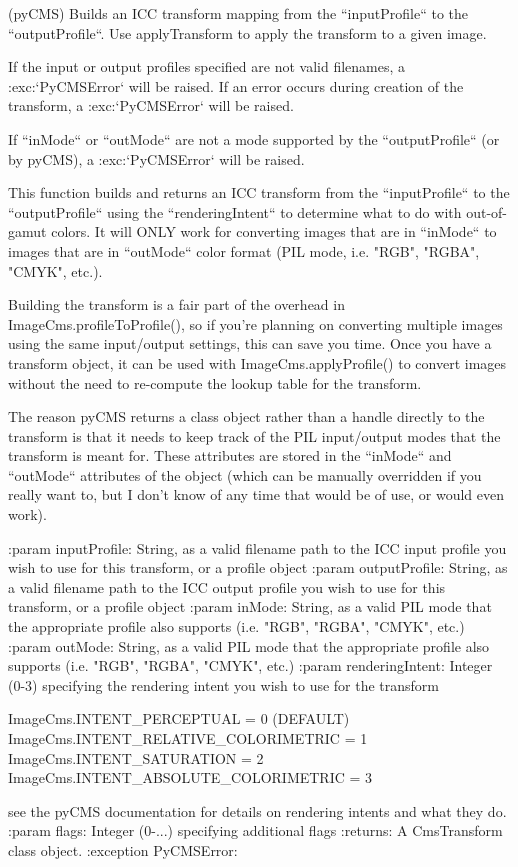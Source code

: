 \begin{DoxyVerb}(pyCMS) Builds an ICC transform mapping from the ``inputProfile`` to the
``outputProfile``. Use applyTransform to apply the transform to a given
image.

If the input or output profiles specified are not valid filenames, a
:exc:`PyCMSError` will be raised. If an error occurs during creation
of the transform, a :exc:`PyCMSError` will be raised.

If ``inMode`` or ``outMode`` are not a mode supported by the ``outputProfile``
(or by pyCMS), a :exc:`PyCMSError` will be raised.

This function builds and returns an ICC transform from the ``inputProfile``
to the ``outputProfile`` using the ``renderingIntent`` to determine what to do
with out-of-gamut colors.  It will ONLY work for converting images that
are in ``inMode`` to images that are in ``outMode`` color format (PIL mode,
i.e. "RGB", "RGBA", "CMYK", etc.).

Building the transform is a fair part of the overhead in
ImageCms.profileToProfile(), so if you're planning on converting multiple
images using the same input/output settings, this can save you time.
Once you have a transform object, it can be used with
ImageCms.applyProfile() to convert images without the need to re-compute
the lookup table for the transform.

The reason pyCMS returns a class object rather than a handle directly
to the transform is that it needs to keep track of the PIL input/output
modes that the transform is meant for.  These attributes are stored in
the ``inMode`` and ``outMode`` attributes of the object (which can be
manually overridden if you really want to, but I don't know of any
time that would be of use, or would even work).

:param inputProfile: String, as a valid filename path to the ICC input
    profile you wish to use for this transform, or a profile object
:param outputProfile: String, as a valid filename path to the ICC output
    profile you wish to use for this transform, or a profile object
:param inMode: String, as a valid PIL mode that the appropriate profile
    also supports (i.e. "RGB", "RGBA", "CMYK", etc.)
:param outMode: String, as a valid PIL mode that the appropriate profile
    also supports (i.e. "RGB", "RGBA", "CMYK", etc.)
:param renderingIntent: Integer (0-3) specifying the rendering intent you
    wish to use for the transform

        ImageCms.INTENT_PERCEPTUAL            = 0 (DEFAULT)
        ImageCms.INTENT_RELATIVE_COLORIMETRIC = 1
        ImageCms.INTENT_SATURATION            = 2
        ImageCms.INTENT_ABSOLUTE_COLORIMETRIC = 3

    see the pyCMS documentation for details on rendering intents and what
    they do.
:param flags: Integer (0-...) specifying additional flags
:returns: A CmsTransform class object.
:exception PyCMSError:
\end{DoxyVerb}
 \mbox{\label{namespacePIL_1_1ImageCms_a78aa4c3a0a52c2214fd602520d49fba9}} 
